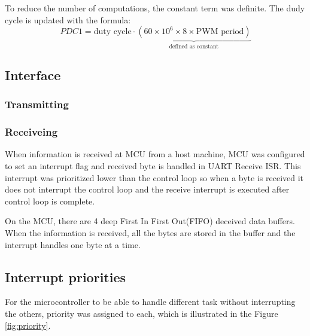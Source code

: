To reduce the number of computations, the constant term was definite. The dudy cycle is  updated with the formula:
\[
    PDC1 = \text{duty cycle}\cdot \underbrace{(60\times10^6\times 8\times \text{PWM period})}_{\text{defined as constant}}
\]


\subsection{Interface}

\subsubsection{Transmitting}

\subsubsection{Receiveing}
When information is received at MCU from a host machine, MCU was configured to set an interrupt flag and received byte is handled in UART Receive ISR. This interrupt was prioritized lower than the control loop so when a byte is received it does not interrupt the control loop and the receive interrupt is executed after control loop is complete.

On the MCU, there are 4 deep First In First Out(FIFO) deceived data buffers. When the information is received, all the bytes are stored in the buffer and the interrupt handles one byte at a time.


\subsection{Interrupt priorities}
For the microcontroller to be able to handle different task without interrupting the others, priority was assigned to each, which is illustrated in the Figure \ref{fig:priority}.

